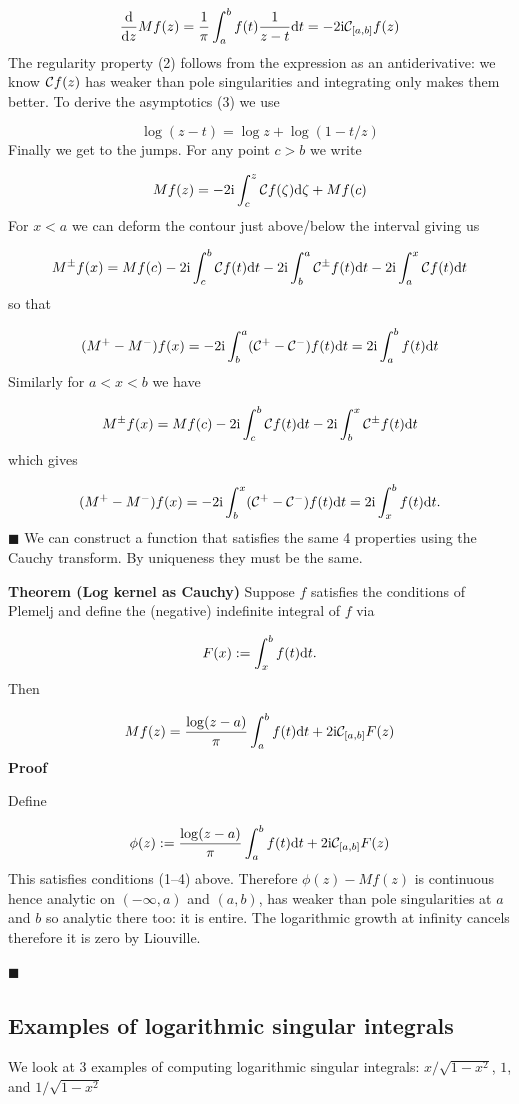 \documentclass[12pt,landscape]{article}
\def\D{ {\rm d} }
\def\I{ {\rm i} }
\def\CC{ {\cal C} }
\def\dt{\D t}
\def\endash{–}
\begin{document}
{\[
{\D \over \D z} M f(z) = {1 \over \pi} \int_{a}^b f(t) {1\over z -t}  \dt = -2 \I \CC_{[a,b]} f(z)
\]
The regularity property (2) follows from the expression as an antiderivative: we know $\CC f(z)$ has weaker than pole singularities and integrating only makes them better. To derive the asymptotics (3) we use

\[
\log(z - t) = \log z + \log(1 - t/z)
\]
\newpage
Finally we get to the jumps. For any point $c > b$ we write

\[
M f(z) = -2 \I \int_c^z \CC f(\zeta) \D \zeta + M f(c)
\]
For $x < a$ we can deform the contour just above/below the interval giving us

\[
M^\pm f(x) = Mf(c) -2 \I \int_c^b \CC f(t) \D t -2 \I \int_b^a \CC^\pm f(t) \D t -2 \I \int_a^x \CC f(t) \D t
\]
so that

\[
(M^+ - M^-) f(x) = -2 \I \int_b^a (\CC^+ - \CC^-) f(t) \D t  = 2 \I \int_a^b f(t) \D t
\]
Similarly for $a < x < b$ we have

\[
M^\pm f(x) = Mf(c) -2 \I \int_c^b \CC f(t) \D t -2 \I \int_b^x \CC^\pm f(t) \D t
\]
which gives

\[
(M^+ - M^-) f(x) = -2 \I \int_b^x (\CC^+ - \CC^-) f(t) \D t  = 2 \I \int_x^b f(t) \D t.
\]
\ensuremath{\blacksquare}
\newpage
We can construct a function that satisfies the same 4 properties using the Cauchy transform. By uniqueness they must be the same.

\textbf{Theorem (Log kernel as Cauchy)} Suppose $f$ satisfies the conditions of Plemelj and define the (negative) indefinite integral of $f$ via

\[
F(x) := \int_x^b f(t) \D t.
\]
Then

\[
M f(z) = {\log(z-a) \over \pi} \int_a^b f(t) \D t + 2 \I \CC_{[a,b]} F(z)
\]
\textbf{Proof}

Define

\[
\phi(z) := {\log(z-a) \over \pi} \int_a^b f(t) \D t + 2 \I \CC_{[a,b]} F(z)
\]
This satisfies conditions (1\ensuremath{\endash}4) above. Therefore $\phi(z) - M f(z)$ is continuous hence analytic on $(-\infty,a)$ and $(a,b)$, has weaker than pole singularities at $a$ and $b$ so analytic there too: it is entire. The logarithmic growth at infinity cancels therefore it is zero by Liouville.

\ensuremath{\blacksquare}

\subsection{Examples of logarithmic singular integrals}
We look at 3 examples of computing logarithmic singular integrals: $x/\sqrt{1-x^2}$, $1$, and $1/\sqrt{1-x^2}$

}
\end{document}
